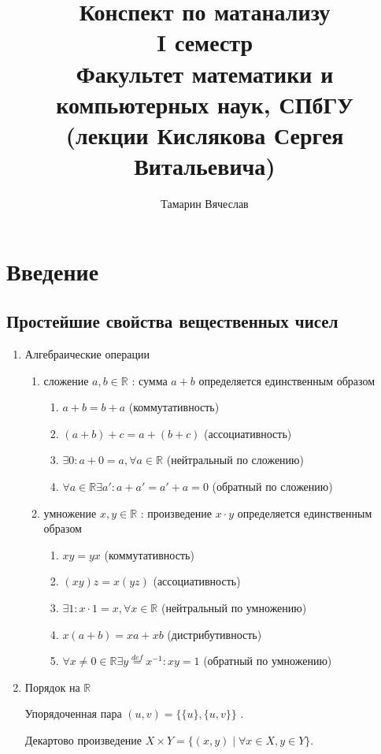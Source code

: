 \documentclass[11pt]{book}
\title{Конспект по матанализу\\I семестр\\
    Факультет математики и компьютерных наук, СПбГУ\\
(лекции Кислякова Сергея Витальевича)}
\author{Тамарин Вячеслав}
\newcommand{\R}{\mathbb{R}}
\theoremstyle{definition}
\theoremstyle{plain}
\theoremstyle{plain}
\theoremstyle{definition}
\theoremstyle{remark}
\begin{document}
\maketitle
\tableofcontents


\chapter{Введение}
\section{Простейшие свойства вещественных чисел}
\begin{enumerate}
    \item Алгебраические операции
	\begin{enumerate}
	    \item сложение $a, b \in \R$ : сумма $a+b$ определяется единственным образом
		\begin{enumerate}
		    \item  $a+b = b+a$ (коммутативность)
		    \item  $(a+b)+c = a+(b+c)$ (ассоциативность)
		    \item  $\exists 0: a +0 = a, \forall a \in \R$ (нейтральный по сложению)
		    \item  $\forall a \in \R \exists a': a +a' = a' + a = 0 $ (обратный по сложению)
		\end{enumerate}
	    \item умножение $x,y \in \R$ : произведение $x\cdot y$ определяется единственным образом
		\begin{enumerate}
		    \item  $x y = y x$ (коммутативность)
		    \item  $(xy)z = x(yz)$ (ассоциативность)
		    \item  $\exists 1: x \cdot 1 = x, \forall x \in \R$ (нейтральный по умножению)
		    \item  $x(a+b) =xa + xb$ (дистрибутивность)
		    \item  $\forall x\ne 0 \in \R \exists y  \stackrel{def} = x^{-1}: xy = 1$ (обратный по умножению)
		\end{enumerate}
	\end{enumerate}
    \item Порядок на $\R$
	\begin{defn}
	    Упорядоченная пара $(u, v) = \{\{u\}, \{u, v\}\}$ .
	\end{defn}
	\begin{defn}
	    Декартово произведение $X \times Y = \{(x, y) \mid \forall x \in X, y \in Y\}$.

\end{defn}
\end{enumerate}
\end{document}

